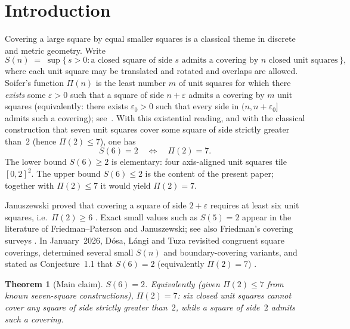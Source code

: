 \documentclass[11pt,reqno]{amsart}
\newtheorem{theorem}{Theorem}[section]
\theoremstyle{definition}
\begin{document}
\section{Introduction}\label{sec:intro}

Covering a large square by equal smaller squares is a classical theme in
discrete and metric geometry.  Write
\begin{equation}\label{eq:Sn}
S(n)
\;=\;
\sup\bigl\{\,s>0 :
\text{a closed square of side~$s$ admits a covering by~$n$ closed unit squares}
\,\bigr\},
\end{equation}
where each unit square may be translated and rotated and overlaps are allowed.
Soifer's function $\Pi(n)$ is the least number $m$ of unit squares for which
there \emph{exists} some $\varepsilon>0$ such that a square of side
$n+\varepsilon$ admits a covering by $m$ unit squares
(equivalently: there exists $\varepsilon_0>0$ such that every side in
$(n,n+\varepsilon_0]$ admits such a covering);
see~\cite{Soifer2006,SoiferCoverUp}.  With this existential reading, and with
the classical construction that seven unit squares cover some square of side
strictly greater than~$2$ (hence $\Pi(2)\le 7$), one has
\begin{equation}\label{eq:equiv}
S(6)=2
\quad\Longleftrightarrow\quad
\Pi(2)=7.
\end{equation}
The lower bound $S(6)\ge 2$ is elementary: four axis-aligned unit squares tile
$[0,2]^2$.  The upper bound $S(6)\le 2$ is the content of the present
paper; together with $\Pi(2)\le 7$ it would yield $\Pi(2)=7$.

Januszewski proved that covering a square of side $2+\varepsilon$ requires at
least six unit squares, i.e.\ $\Pi(2)\ge 6$ \cite{Januszewski2009}.
Exact small values such as $S(5)=2$ appear in the literature of
Friedman--Paterson and Januszewski; see also Friedman's covering surveys
\cite{FriedmanPaterson2006,FriedmanCovering}.
In January~2026, D\'osa, L\'angi and Tuza revisited congruent square coverings,
determined several small $S(n)$ and boundary-covering variants, and stated as
Conjecture~1.1 that $S(6)=2$ (equivalently $\Pi(2)=7$) \cite{DLT2026}.

\begin{theorem}[Main claim]\label{thm:main}
$S(6)=2$.  Equivalently (given $\Pi(2)\le 7$ from known seven-square
constructions), $\Pi(2)=7$: six closed unit squares cannot cover any square of
side strictly greater than~$2$, while a square of side~$2$ admits such a
covering.
\end{theorem}
\end{document}

